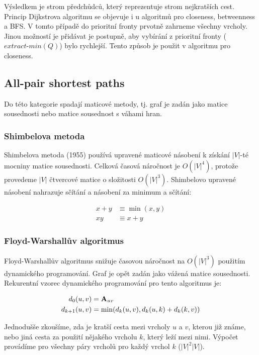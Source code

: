 \documentclass{bakalarka}
\begin{document}
Výsledkem je strom předchůdců, který reprezentuje strom nejkratších cest.
Princip Dijkstrova algoritmu se objevuje i u algoritmů pro closeness,
betweenness a BFS. V tomto případě do prioritní fronty prvotně zahrneme všechny
vrcholy. Jinou možností je přidávat je postupně, aby vybírání z prioritní
fronty ($extract\mbox{-}min(Q)$) bylo rychlejší. Tento způsob je použit v
algoritmu pro closeness.


\subsection{All-pair shortest paths}
Do této kategorie spadají maticové metody, tj. graf je zadán jako matice
sousednosti nebo matice sousednost s váhami hran.


\subsubsection{Shimbelova metoda}
Shimbelova metoda (1955) používá upravené maticové násobení k získání $|V|$-té
mocniny matice sousednosti. Celková časová náročnost je $O(|V|^4)$, protože
provedeme $|V|$  čtvercové matice o složitosti $O(|V|^3)$.
Shimbelovo upravené násobení nahrazuje sčítání a násobení za minimum a sčítání:

\begin{align*}
x + y &\equiv \min(x, y) \\
xy &\equiv x + y
\end{align*}

\subsubsection{Floyd-Warshallův algoritmus}
Floyd-Warshallův algoritmus snižuje časovou náročnost na $O(|V|^3)$
použitím dynamického programování. Graf je opět zadán jako vážená matice
sousednosti. Rekurentní vzorec dynamického programování pro tento algoritmus je:

\begin{align*}
d_0(u, v) &= {\bf A}_{uv} \\
d_{k + 1}(u, v) &= \min(d_k(u, v), d_k(u, k) + d_k(k, v)) \\
\end{align*}

Jednodušše zkoušíme, zda je kratší cesta mezi vrcholy $u$ a $v$, kterou již
známe, nebo jiná cesta za použití nějakého vrcholu $k$, který leží mezi nimi.
Výpočet provádíme pro všechny páry vrcholů pro každý vrchol $k$ ($|V|^2 |V|$).
\end{document}
